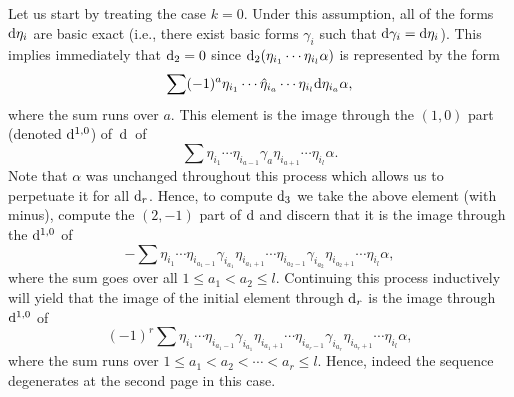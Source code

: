 \documentclass[pdftex]{sigma}
\numberwithin{equation}{section}
\theoremstyle{definition}
\begin{document}
Let us start by treating the case $k=0$. Under this assumption, all of the forms ${\rm d}\eta_i$ are basic exact (i.e., there exist basic forms $\gamma_i$ such that ${\rm d}\gamma_i={\rm d}\eta_i$). This implies immediately that ${\rm d}_2=0$ since ${\rm d}_2(\eta_{i_1}\cdots \eta_{i_l}\alpha)$ is represented by the form
\[\sum (-1)^a\eta_{i_1}\cdots \hat{\eta}_{i_{a}}\cdots \eta_{i_l}{\rm d}\eta_{i_a}\alpha,\]
where the sum runs over $a$. This element is the image through the $(1,0)$ part \big(denoted ${\rm d}^{1,0}$\big) of~${\rm d}$~of
\[\sum \eta_{i_1}\cdots \eta_{i_{a-1}}\gamma_{a}\eta_{i_{a+1}}\cdots \eta_{i_l}\alpha.\]
Note that $\alpha$ was unchanged throughout this process which allows us to perpetuate it for all ${\rm d}_r$. Hence, to compute ${\rm d}_3$ we take the above element (with minus), compute the $(2,-1)$ part of ${\rm d}$ and discern that it is the image through the ${\rm d}^{1,0}$ of
\[-\sum \eta_{i_1}\cdots \eta_{i_{a_1-1}}\gamma_{i_{a_1}}\eta_{i_{a_1+1}}\cdots \eta_{i_{a_2-1}}\gamma_{i_{a_2}}\eta_{i_{a_2+1}}\cdots \eta_{i_l}\alpha,\]
where the sum goes over all $1\leq a_1<a_2\leq l$. Continuing this process inductively will yield that the image of the initial element through ${\rm d}_r$ is the image through ${\rm d}^{1,0}$ of
\[(-1)^r\sum \eta_{i_1}\cdots \eta_{i_{a_1-1}}\gamma_{i_{a_1}}\eta_{i_{a_1+1}}\cdots \eta_{i_{a_r-1}}\gamma_{i_{a_r}}\eta_{i_{a_r+1}}\cdots \eta_{i_l}\alpha,\]
where the sum runs over $1\leq a_1<a_2<\cdots <a_r\leq l$. Hence, indeed the sequence degenerates at the second page in this case.
\end{document}
